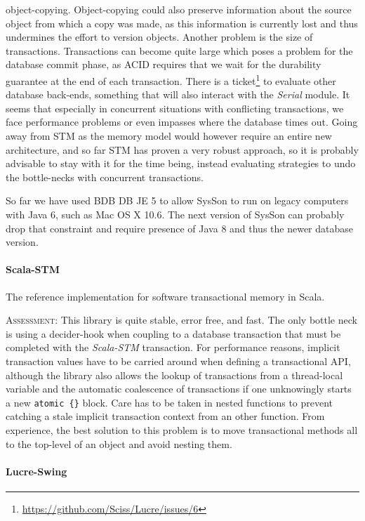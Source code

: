 \documentclass[11pt,a4paper]{article}
\newcommand{\software}[1]{\textit{#1}}
\newcommand{\sysson}[0]{SysSon}
\newcommand{\assessment}[0]{\textsc{Assessment:}}
\begin{document}
object-copying. Object-copying could also preserve information about the source object from which a copy was made, as this information is currently lost and thus undermines the effort to version objects. Another problem is the size of transactions. Transactions can become quite large which poses a problem for the database commit phase, as ACID requires that we wait for the durability guarantee at the end of each transaction. There is a ticket\footnote{\url{https://github.com/Sciss/Lucre/issues/6}} to evaluate other database back-ends, something that will also interact with the \software{Serial} module. It seems that especially in concurrent situations with conflicting transactions, we face performance problems or even impasses where the database times out. Going away from STM as the memory model would however require an entire new architecture, and so far STM has proven a very robust approach, so it is probably advisable to stay with it for the time being, instead evaluating strategies to undo the bottle-necks with concurrent transactions.

So far we have used BDB DB JE 5 to allow \sysson{} to run on legacy computers with Java 6, such as Mac OS X 10.6. The next version of \sysson{} can probably drop that constraint and require presence of Java 8 and thus the newer database version.

\paragraph{Scala-STM}

The reference implementation for software transactional memory in Scala. 

\assessment{} This library is quite stable, error free, and fast. The only bottle neck is using a decider-hook when coupling to a database transaction that must be completed with the \software{Scala-STM} transaction. For performance reasons, implicit transaction values have to be carried around when defining a transactional API, although the library also allows the lookup of transactions from a thread-local variable and the automatic coalescence of transactions if one unknowingly starts a new \verb!atomic {}! block. Care has to be taken in nested functions to prevent catching a stale implicit transaction context from an other function. From experience, the best solution to this problem is to move transactional methods all to the top-level of an object and avoid nesting them.

\paragraph{Lucre-Swing}
\end{document}

